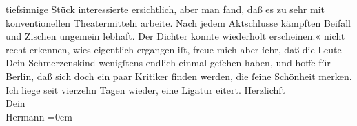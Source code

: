 \begin{ledgroupsized}[t]{13cm}
{{{                     tiefsinnige Stück interessierte ersichtlich, aber man fand, daß es zu sehr mit
                     konventionellen Theatermitteln arbeite. Nach jedem Aktschlusse kämpften Beifall
                     und Zischen ungemein lebhaft. Der Dichter konnte wiederholt
                  erscheinen.«}}}\label{K_L01276_1h} nicht recht erkennen, wies eigentlich ergangen iſt,
               freue mich aber ſehr, daß die Leute Dein Schmerzenskind wenigſtens endlich einmal geſehen haben, und
               hoffe für Berlin, daß sich doch ein paar Kritiker
               finden werden, die ſeine Schönheit merken.\pend
           \pstart
           Ich liege seit vierzehn Tagen wieder, eine Ligatur eitert.\pend
           \pstart
           Herzlichſt{\\[\baselineskip]}Dein{\\[\baselineskip]}\spacefill\mbox{Hermann}\pend
           \leftskip=0em{}
         
         \endnumbering{}\end{ledgroupsized}  \newcommand{\dateiname}{L01276}\newcommand{\titel}{Hermann Bahr an Arthur Schnitzler, 15. 3. 1903}\newcommand{\editorInnen}{ Kurt Ifkovits,  Martin Anton Müller}
      